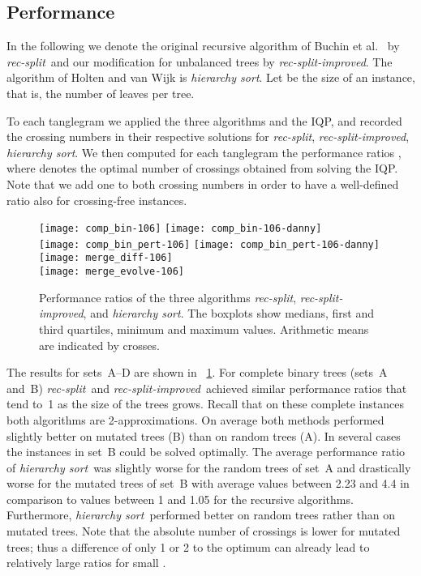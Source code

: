 \documentclass[runningheads,a4paper]{llncs}
\newcommand{\recsplit}{\emph{rec-split}}
\newcommand{\recimproved}{\emph{rec-split-improved}}
\newcommand{\hiersort}{\emph{hierarchy sort}}
\begin{document}
\subsection{Performance}

In the following we denote the original recursive 
algorithm of Buchin et al.~\cite{bbbnow-dbtha-08} by \recsplit\ and
our modification for unbalanced trees by 
\recimproved. The algorithm of Holten and van Wijk is 
\hiersort.  Let  be the size of an instance, that is, the number of
leaves per tree. 

To each tanglegram we applied the three algorithms and the IQP, and
recorded the crossing numbers  in their respective solutions for
 \recsplit, \recimproved, \hiersort.  We then computed for each
tanglegram the performance ratios ,
where  denotes the optimal number of crossings
obtained from solving the IQP. Note that we add one to both crossing
numbers in order to have a well-defined ratio also for crossing-free
instances.

\begin{figure}[tbp]
  \centering
  \texttt{[image: comp\_bin-106]}
  \hfill
  \texttt{[image: comp\_bin-106-danny]}\\
  \texttt{[image: comp\_bin\_pert-106]}
  \hfill
  \texttt{[image: comp\_bin\_pert-106-danny]}\\
  \texttt{[image: merge\_diff-106]}\\
  \texttt{[image: merge\_evolve-106]}
  \caption{Performance ratios of the three algorithms \recsplit,
    \recimproved, and \hiersort.  The boxplots show medians, first and
    third quartiles, minimum and maximum values. Arithmetic means are
    indicated by crosses.}
  \label{fig:ratio}
\end{figure}

The results for sets~A--D are shown in \figurename~\ref{fig:ratio}.
For complete binary trees (sets~A and~B) \recsplit\ and \recimproved\
achieved similar performance ratios that tend to~1 as the size of the
trees grows.  Recall that on these complete instances both algorithms
are 2-approximations. On average both methods performed slightly
better on mutated trees (B) than on random trees (A).  In several
cases the instances in set~B could be solved optimally. The average
performance ratio of \hiersort\ was slightly worse for the random trees
of set~A and drastically worse for the mutated trees of set~B with
average values between 2.23 and 4.4 in comparison to values between 1
and 1.05 for the recursive algorithms.  Furthermore, \hiersort\
performed better on random trees rather than on mutated trees. Note
that the absolute number of crossings is lower for mutated trees; thus
a difference of only 1 or 2 to the optimum can already lead to
relatively large ratios for small .
\end{document}
